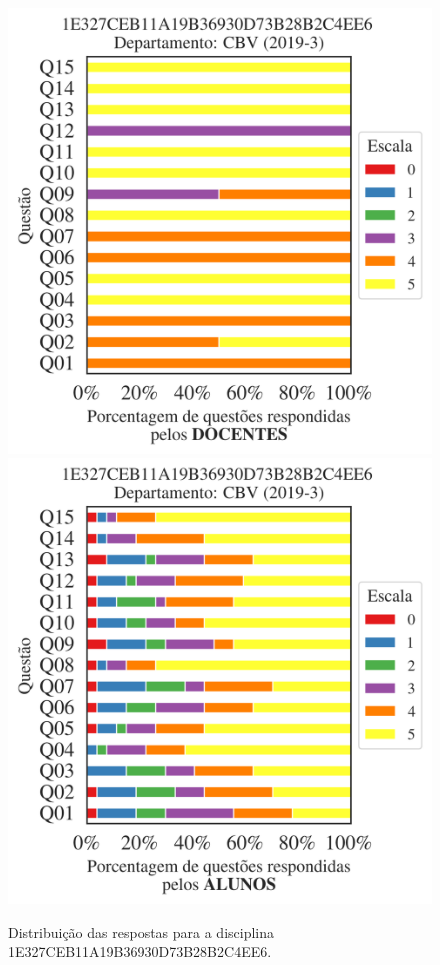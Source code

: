 \documentclass[a4paper,10pt]{article}
\begin{document}
\begin{figure}[h]
\centering
\includegraphics[width=0.485\linewidth]{analise_disciplina_departamento_CBV_1E327CEB11A19B36930D73B28B2C4EE6_docentes.png}
\includegraphics[width=0.485\linewidth]{analise_disciplina_departamento_CBV_1E327CEB11A19B36930D73B28B2C4EE6_alunos.png}
\caption{\label{fig:analise_geral_departamento}                Distribuição das respostas para a disciplina 1E327CEB11A19B36930D73B28B2C4EE6. }
\end{figure}
\end{document}
